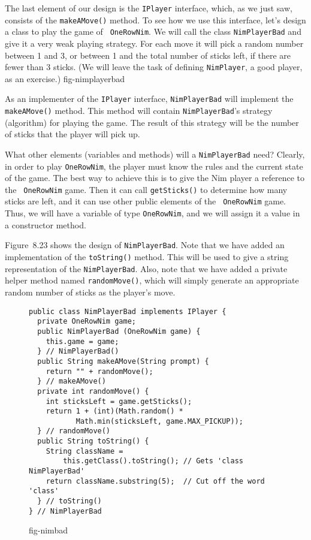 The last element of our design is the {\tt IPlayer} interface, which,
as we just saw, consists of the {\tt makeAMove()} method.  To see how
we use this interface, let's design a class to play the game of {\tt
OneRowNim}.  We will call the class {\tt NimPlayerBad} and give it a
very weak playing strategy. For each move it will pick a random number
between 1 and 3, or between 1 and the total number of sticks left, if
there are fewer than 3 sticks.  (We will leave the task of defining
{\tt NimPlayer}, a good player, as an exercise.)
{fig-nimplayerbad}

As an implementer of the {\tt IPlayer} interface, {\tt NimPlayerBad}
will implement the {\tt makeAMove()} method. This method will contain
{\tt NimPlayerBad}'s strategy (algorithm) for playing the game.  The
result of this strategy will be the number of sticks that the player
will pick up.

What other elements (variables and methods) will a {\tt NimPlayerBad}
need?  Clearly, in order to play {\tt OneRowNim}, the player must know
the rules and the current state of the game.  The best way
to achieve this is to give the Nim player a reference to the {\tt
OneRowNim} game.  Then it can call {\tt getSticks()} to determine how
many sticks are left, and it can use other public elements of the {\tt
OneRowNim} game. Thus, we will have a variable of type {\tt OneRowNim},
and we will assign it a value in a constructor method.

Figure~8.23 shows the design of {\tt NimPlayerBad}. Note that we have
added an implementation of the {\tt toString()} method.  This will
be used to give a string representation of the {\tt NimPlayerBad}.
Also, note that we have added a private helper method named
{\tt randomMove()}, which will simply generate an appropriate
random number of sticks as the player's move.

\begin{figure}[h]
\jjjprogstart
\begin{jjjlisting}[28pc]
\begin{lstlisting}
public class NimPlayerBad implements IPlayer {   
  private OneRowNim game;
  public NimPlayerBad (OneRowNim game) {  
    this.game = game;
  } // NimPlayerBad()
  public String makeAMove(String prompt) {   
    return "" + randomMove();
  } // makeAMove()
  private int randomMove() {   
    int sticksLeft = game.getSticks();
    return 1 + (int)(Math.random() * 
           Math.min(sticksLeft, game.MAX_PICKUP));
  } // randomMove()
  public String toString() { 
    String className = 
        this.getClass().toString(); // Gets 'class NimPlayerBad'
    return className.substring(5);  // Cut off the word 'class'
  } // toString()
} // NimPlayerBad
\end{lstlisting}
\end{jjjlisting}
{fig-nimbad}
\end{figure}

